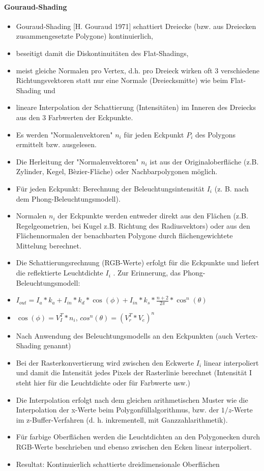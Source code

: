\documentclass[10pt,landscape]{article}
\begin{document}
\begin{multicols}{3}
\paragraph{Gouraud-Shading}
\begin{itemize}
  \item Gouraud-Shading [H. Gouraud 1971] schattiert Dreiecke (bzw. aus Dreiecken zusammengesetzte Polygone) kontinuierlich,
  \item beseitigt damit die Diskontinuitäten des Flat-Shadings,
  \item meist gleiche Normalen pro Vertex, d.h. pro Dreieck wirken oft 3 verschiedene Richtungsvektoren statt nur eine Normale (Dreiecksmitte) wie beim Flat-Shading und
  \item lineare Interpolation der Schattierung (Intensitäten) im Inneren des Dreiecks aus den 3 Farbwerten der Eckpunkte.
  \item Es werden "Normalenvektoren" $n_i$ für jeden Eckpunkt $P_i$ des Polygons ermittelt bzw. ausgelesen.
  \item Die Herleitung der "Normalenvektoren" $n_i$ ist aus der Originaloberfläche (z.B. Zylinder, Kegel, Bèzier-Fläche) oder Nachbarpolygonen möglich.
  \item Für jeden Eckpunkt: Berechnung der Beleuchtungsintensität $I_i$ (z. B. nach dem Phong-Beleuchtungsmodell).
  \item Normalen $n_i$ der Eckpunkte werden entweder direkt aus den Flächen (z.B. Regelgeometrien, bei Kugel z.B. Richtung des Radiusvektors) oder aus den Flächennormalen der benachbarten Polygone durch flächengewichtete Mittelung berechnet.
  \item Die Schattierungsrechnung (RGB-Werte) erfolgt für die Eckpunkte und liefert die reflektierte Leuchtdichte $I_i$ . Zur Erinnerung, das Phong-Beleuchtungsmodell:
  \item $I_{out}=I_a*k_a+I_{in}*k_d*\cos(\phi)+I_{in}*k_s*\frac{n+2}{2\pi}*\cos^n(\theta)$
  \item $\cos(\phi)=V^T_I*n_i$, $cos^n(\theta)=(V^T_r * V_e)^n$
  \item Nach Anwendung des Beleuchtungsmodells an den Eckpunkten (auch Vertex-Shading genannt)
  \item Bei der Rasterkonvertierung wird zwischen den Eckwerte $I_i$ linear interpoliert und damit die Intensität jedes Pixels der Rasterlinie berechnet (Intensität I steht hier für die Leuchtdichte oder für Farbwerte usw.)
  \item Die Interpolation erfolgt nach dem gleichen arithmetischen Muster wie die Interpolation der x-Werte beim Polygonfüllalgorithmus, bzw. der $1/z$-Werte im z-Buffer-Verfahren (d. h. inkrementell, mit Ganzzahlarithmetik).
  \item Für farbige Oberflächen werden die Leuchtdichten an den Polygonecken durch RGB-Werte beschrieben und ebenso zwischen den Ecken linear interpoliert.
  \item Resultat: Kontinuierlich schattierte dreidimensionale Oberflächen
\end{itemize}


\end{multicols}
\end{document}
